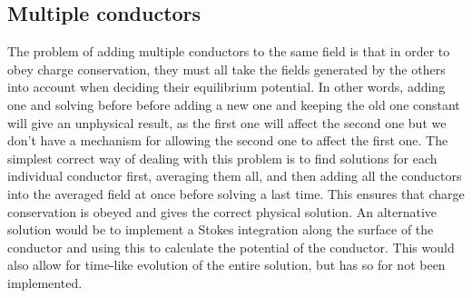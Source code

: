 \documentclass[aps,twocolumn,pre,nofootinbib,10pt]{revtex4-1}
\begin{document}
\subsection{Multiple conductors}
The problem of adding multiple conductors to the same field is that in order to obey charge conservation, they must all take the fields generated by the others into account when deciding their equilibrium potential. In other words, adding one and solving before before adding a new one and keeping the old one constant will give an unphysical result, as the first one will affect the second one but we don't have a mechanism for allowing the second one to affect the first one. The simplest correct way of dealing with this problem is to find solutions for each individual conductor first, averaging them all, and then adding all the conductors into the averaged field at once before solving a last time. This ensures that charge conservation is obeyed and gives the correct physical solution. An alternative solution would be to implement a Stokes integration along the surface of the conductor and using this to calculate the potential of the conductor. This would also allow for time-like evolution of the entire 
solution, but has so for not been implemented.
\end{document}
